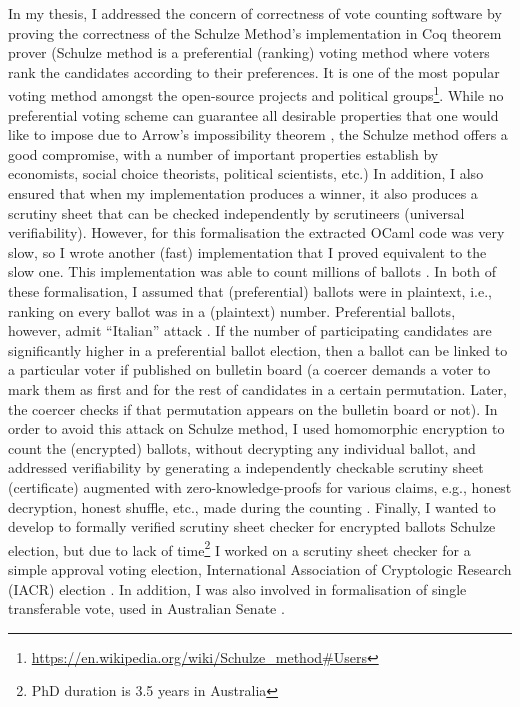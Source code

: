 \documentclass[a4paper]{article}
\begin{document}
In my thesis, I addressed the concern of correctness of vote counting 
software by proving the correctness of the Schulze Method's implementation in 
Coq theorem prover \cite{10.1007/978-3-319-66107-0_26}
(Schulze method is a preferential (ranking) voting method where voters rank the 
candidates according to their preferences. It is one of the most popular voting method amongst the open-source projects and 
political groups\footnote{\url{https://en.wikipedia.org/wiki/Schulze_method#Users}}.
While no preferential voting scheme can guarantee all
desirable properties that one would like to impose due to Arrow's impossibility theorem \cite{arrow1950difficulty}, 
the Schulze method offers a good compromise, with a number of important properties establish by economists, 
social choice theorists, political scientists, etc.) In addition, I also ensured that when my implementation
produces a winner, it also produces a scrutiny sheet that can be checked independently by 
scrutineers (universal verifiability).  However, for this formalisation the extracted OCaml code was 
very slow, so I wrote another (fast) implementation 
that I proved equivalent to the slow one. This implementation was able to count millions of ballots \cite{bennett2017no}.
In both of these formalisation, I assumed that (preferential) ballots were in plaintext, i.e., ranking on 
every ballot was in a (plaintext) number.  Preferential ballots, 
however, admit ``Italian'' attack \cite{Otten, Benaloh:2009:SSC}. 
If the number of participating candidates are significantly higher in 
a preferential ballot election,
then a ballot can be linked to a particular voter if published on bulletin board
(a coercer demands a voter to mark them as first and for the rest of candidates
in a certain permutation. Later, the coercer checks if that permutation appears 
on the bulletin board or not). In order to
avoid this attack on Schulze method, I used homomorphic encryption to count the (encrypted) ballots, without decrypting 
any individual ballot, and addressed verifiability by generating a independently checkable scrutiny sheet (certificate) 
augmented with zero-knowledge-proofs for various claims, e.g., honest decryption, honest shuffle, etc.,  
made during the counting \cite{10.1007/978-3-030-41600-3_4}. Finally, I wanted to develop to formally 
verified scrutiny sheet checker for encrypted ballots Schulze election, but due to lack of 
time\footnote{PhD duration is 3.5 years in Australia} I worked on a scrutiny sheet checker for a simple approval voting election,
International Association of Cryptologic Research (IACR) election \cite{10.1145/3319535.3354247}.
In addition, I was also involved in formalisation of single transferable vote, used in Australian Senate
\cite{10.1007/978-3-030-00419-4_4}.
\end{document}
